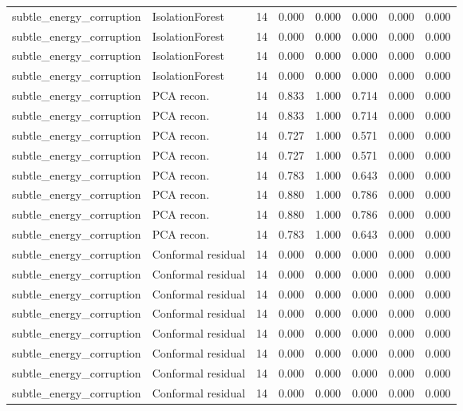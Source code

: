 {\begin{longtable}{llrrrrrr}
subtle\_energy\_corruption & IsolationForest & 14 & 0.000 & 0.000 & 0.000 & 0.000 & 0.000 \\
subtle\_energy\_corruption & IsolationForest & 14 & 0.000 & 0.000 & 0.000 & 0.000 & 0.000 \\
subtle\_energy\_corruption & IsolationForest & 14 & 0.000 & 0.000 & 0.000 & 0.000 & 0.000 \\
subtle\_energy\_corruption & IsolationForest & 14 & 0.000 & 0.000 & 0.000 & 0.000 & 0.000 \\
subtle\_energy\_corruption & PCA recon. & 14 & 0.833 & 1.000 & 0.714 & 0.000 & 0.000 \\
subtle\_energy\_corruption & PCA recon. & 14 & 0.833 & 1.000 & 0.714 & 0.000 & 0.000 \\
subtle\_energy\_corruption & PCA recon. & 14 & 0.727 & 1.000 & 0.571 & 0.000 & 0.000 \\
subtle\_energy\_corruption & PCA recon. & 14 & 0.727 & 1.000 & 0.571 & 0.000 & 0.000 \\
subtle\_energy\_corruption & PCA recon. & 14 & 0.783 & 1.000 & 0.643 & 0.000 & 0.000 \\
subtle\_energy\_corruption & PCA recon. & 14 & 0.880 & 1.000 & 0.786 & 0.000 & 0.000 \\
subtle\_energy\_corruption & PCA recon. & 14 & 0.880 & 1.000 & 0.786 & 0.000 & 0.000 \\
subtle\_energy\_corruption & PCA recon. & 14 & 0.783 & 1.000 & 0.643 & 0.000 & 0.000 \\
subtle\_energy\_corruption & Conformal residual & 14 & 0.000 & 0.000 & 0.000 & 0.000 & 0.000 \\
subtle\_energy\_corruption & Conformal residual & 14 & 0.000 & 0.000 & 0.000 & 0.000 & 0.000 \\
subtle\_energy\_corruption & Conformal residual & 14 & 0.000 & 0.000 & 0.000 & 0.000 & 0.000 \\
subtle\_energy\_corruption & Conformal residual & 14 & 0.000 & 0.000 & 0.000 & 0.000 & 0.000 \\
subtle\_energy\_corruption & Conformal residual & 14 & 0.000 & 0.000 & 0.000 & 0.000 & 0.000 \\
subtle\_energy\_corruption & Conformal residual & 14 & 0.000 & 0.000 & 0.000 & 0.000 & 0.000 \\
subtle\_energy\_corruption & Conformal residual & 14 & 0.000 & 0.000 & 0.000 & 0.000 & 0.000 \\
subtle\_energy\_corruption & Conformal residual & 14 & 0.000 & 0.000 & 0.000 & 0.000 & 0.000 \\

\end{longtable}}
